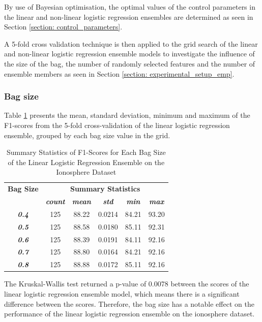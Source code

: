 \documentclass[10pt, conference]{IEEEtran}
\begin{document}
By use of Bayesian optimisation, the optimal values of the control parameters in the
linear and non-linear logistic regression ensembles are determined as seen in
Section \ref{section: control_parameters}.

A 5-fold cross validation technique is then applied to the grid search of the linear and non-linear logistic regression ensemble models
to investigate the influence of the size of the bag, the number of randomly selected features and
the number of ensemble members as seen in Section \ref{section: experimental_setup_emp}.

\subsubsection{Bag size}

Table \ref{table: I_bagsize_linear_performance_metrics} presents the mean, standard deviation, minimum and maximum of the
F1-scores from the 5-fold cross-validation of the linear logistic regression ensemble, grouped by each bag size
value in the grid.
\begin{table}[H]
    \caption{Summary Statistics of F1-Scores for Each Bag Size of the Linear Logistic Regression Ensemble on the Ionosphere Dataset}
    \begin{center}
        \begin{tabular}{|c||c|c|c|c|c|}
            \hline
            \textbf{Bag Size}&\multicolumn{5}{|c|}{\textbf{Summary Statistics}} \\
            \cline{2-6}
                       &\textbf{\textit{count}} & \textbf{\textit{mean}} & \textbf{\textit{std}} & \textbf{\textit{min}} & \textbf{\textit{max}}\\
            \hline
            \textbf{\textit{0.4}} & 125 & 88.22 & 0.0214 & 84.21 & 93.20 \\
            \textbf{\textit{0.5}} & 125 & 88.58 & 0.0180 & 85.11 & 92.31 \\
            \textbf{\textit{0.6}} & 125 & 88.39 & 0.0191 & 84.11 & 92.16 \\
            \textbf{\textit{0.7}} & 125 & 88.80 & 0.0164 & 84.21 & 92.16 \\
            \textbf{\textit{0.8}} & 125 & 88.88 & 0.0172 & 85.11 & 92.16 \\
            \hline
        \end{tabular}
    \end{center}
    \label{table: I_bagsize_linear_performance_metrics}
\end{table}
The Kruskal-Wallis test returned a p-value of 0.0078 between the scores of the linear logistic regression ensemble model,
which means there is a significant difference between the scores. Therefore, the bag size has a notable effect on the
performance of the linear logistic regression ensemble on the ionosphere dataset.
\end{document}
